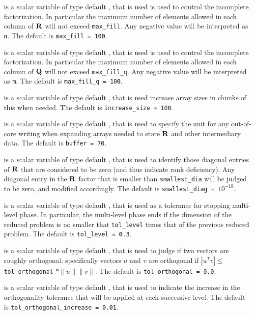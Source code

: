 \documentclass{galahad}
\begin{document}
\begin{description}
 is a scalar variable of type default \integer, that is used
is used to control the incomplete factorization. In particular
the maximum number of elements allowed in each column of ${\mathbf{R}}$ will not exceed
{\tt max\_fill}.
Any negative value will be interpreted as {\tt n}.
The default is {\tt max\_fill = 100}.

 is a scalar variable of type default \integer, that is used
is used to control the incomplete factorization. In particular
the maximum number of elements allowed in each column of ${\mathbf{Q}}$ will not exceed
{\tt max\_fill\_q}.
Any negative value will be interpreted as {\tt m}.
The default is {\tt max\_fill\_q = 100}.

  is a scalar variable of type default \integer, that is
used increase array sizes in chunks of this when needed.
The default is {\tt increase\_size = 100}.

 is a scalar variable of type default \integer, that is used
to specify the unit for any out-of-core writing when expanding arrays
needed to store ${\mathbf{R}}$ and other intermediary data.
The default is {\tt buffer = 70}.

 is a scalar variable of type default \realdp, that is used
to identify those diagonal entries of ${\mathbf{R}}$ that are considered to be zero
(and thus indicate rank deficiency). Any diagonal entry in the ${\mathbf{R}}$
factor that is smaller than {\tt smallest\_dia} will be judged to be zero,
and modified accordingly.
The default is {\tt smallest\_diag = }$10^{-10}$.

 is a scalar variable of type default \realdp, that is used
as a tolerance for stopping multi-level phase. In particular, the
multi-level phase ends if the dimension of the reduced problem
is no smaller that {\tt tol\_level} times that of the previous
reduced problem.
The default is {\tt tol\_level = 0.3}.

 is a scalar variable of type default \realdp,
that is used to judge if two vectors are roughly orthogonal; specifically
vectors $u$ and $v$ are orthogonal if $|u^T v| \leq$ {\tt tol\_orthogonal}
$\ast \|u\| \|v\|$.
The default is {\tt tol\_orthogonal = 0.0}.

 is a scalar variable of type default \realdp,
that is used to indicate the increase in the orthogonality tolerance
that will be applied at each successive level.
The default is {\tt tol\_orthogonal\_increase = 0.01}.


\end{description}
\end{document}

